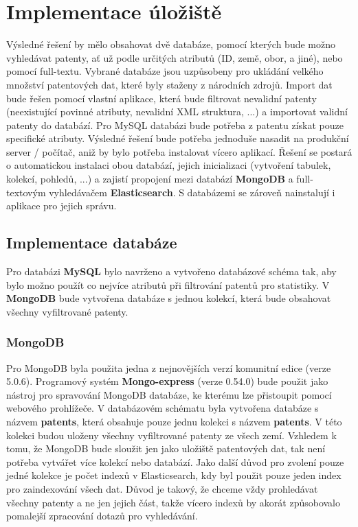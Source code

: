 \chapter{Implementace úložiště}
Výsledné řešení by mělo obsahovat dvě databáze, pomocí kterých bude možno vyhledávat patenty, ať už podle určitých atributů (ID, země, obor, a jiné), nebo pomocí full-textu. Vybrané databáze jsou uzpůsobeny pro ukládání velkého množství patentových dat, které byly staženy z národních zdrojů. 
\newline
\indent Import dat bude řešen pomocí vlastní aplikace, která bude filtrovat nevalidní patenty (neexistující povinné atributy, nevalidní \gls{XML} struktura, ...) a importovat validní patenty do databází. Pro MySQL databázi bude potřeba z patentu získat pouze specifické atributy.
\newline
\indent Výsledné řešení bude potřeba jednoduše nasadit na produkční server / počítač, aniž by bylo potřeba instalovat vícero aplikací. Řešení se postará o automatickou instalaci obou databází, jejich inicializaci (vytvoření tabulek, kolekcí, pohledů, ...) a zajistí propojení mezi databází \textbf{MongoDB} a full-textovým vyhledávačem \textbf{Elasticsearch}. S databázemi se zároveň nainstalují i aplikace pro jejich správu.

\section{Implementace databáze}
Pro databázi \textbf{MySQL} bylo navrženo a vytvořeno databázové schéma tak, aby bylo možno použít co nejvíce atributů při filtrování patentů pro statistiky. V \textbf{MongoDB} bude vytvořena databáze s jednou kolekcí, která bude obsahovat všechny vyfiltrované patenty.
\subsection{MongoDB}
Pro MongoDB byla použita jedna z nejnovějších verzí komunitní edice (verze 5.0.6). Programový systém \textbf{Mongo-express} (verze 0.54.0) bude použit jako nástroj pro spravování MongoDB databáze, ke kterému lze přistoupit pomocí webového prohlížeče.
\newline
\indent V databázovém schématu byla vytvořena databáze s názvem \textbf{patents}, která obsahuje pouze jednu kolekci s názvem \textbf{patents}. V této kolekci budou uloženy všechny vyfiltrované patenty ze všech zemí. Vzhledem k tomu, že MongoDB bude sloužit jen jako uložiště patentových dat, tak není potřeba vytvářet více kolekcí nebo databází. Jako další důvod pro zvolení pouze jedné kolekce je počet indexů v Elasticsearch, kdy byl použit pouze jeden index pro zaindexování všech dat. Důvod je takový, že chceme vždy prohledávat všechny patenty a ne jen jejich část, takže vícero indexů by akorát způsobovalo pomalejší zpracování dotazů pro vyhledávání.

